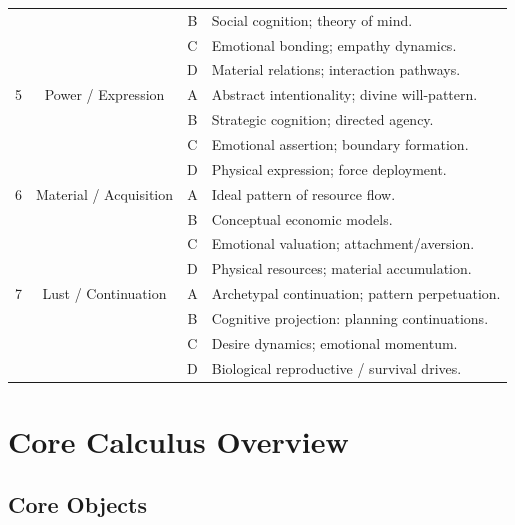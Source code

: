 \documentclass[11pt,twoside,openright]{book}
\theoremstyle{definition}
\theoremstyle{plain}
\theoremstyle{remark}
\begin{document}
\begin{table}[H]
{\begin{tabular}{c|c|c|p{6.5cm}}
  &                          & B & Social cognition; theory of mind. \\
  &                          & C & Emotional bonding; empathy dynamics. \\
  &                          & D & Material relations; interaction pathways. \\
\midrule
5 & Power / Expression    & A & Abstract intentionality; divine will-pattern. \\
  &                       & B & Strategic cognition; directed agency. \\
  &                       & C & Emotional assertion; boundary formation. \\
  &                       & D & Physical expression; force deployment. \\
\midrule
6 & Material / Acquisition & A & Ideal pattern of resource flow. \\
  &                        & B & Conceptual economic models. \\
  &                        & C & Emotional valuation; attachment/aversion. \\
  &                        & D & Physical resources; material accumulation. \\
\midrule
7 & Lust / Continuation   & A & Archetypal continuation; pattern perpetuation. \\
  &                       & B & Cognitive projection: planning continuations. \\
  &                       & C & Desire dynamics; emotional momentum. \\
  &                       & D & Biological reproductive / survival drives. \\
\bottomrule
\end{tabular}%
}
\end{table}

\chapter{Core Calculus Overview}
\label{ch:core-calculus}

\section{Core Objects}
\end{document}
